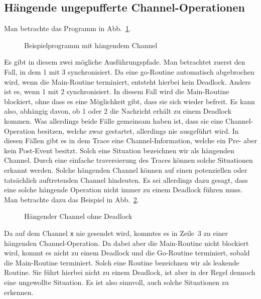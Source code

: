 \subsection{Hängende ungepufferte Channel-Operationen}\label{Chap:Analyze-Sec:Channel-SubSec:Dangling}
Man betrachte das Programm in Abb.~\ref{Chap:Analyze-Sec:Channel-SubSec:Dangling-Fig:ExDangling}.
\begin{figure}[h!]
  
  \caption{Beispielprogramm mit hängendem Channel}
  \label{Chap:Analyze-Sec:Channel-SubSec:Dangling-Fig:ExDangling}
\end{figure}
Es gibt in diesem zwei mögliche Ausführungspfade. Man betrachtet zuerst den Fall, in dem 1 mit 3 synchronisiert. 
Da eine go-Routine automatisch abgebrochen wird,  
wenn die Main-Routine terminiert, entsteht hierbei kein Deadlock. Anders ist es, wenn 1 mit 2 synchronisiert. 
In diesem Fall wird die Main-Routine blockiert, ohne dass es eine Möglichkeit gibt, dass sie sich wieder 
befreit. Es kann also, abhängig davon, ob 1 oder 2 die Nachricht erhält zu einem Deadlock kommen. Was 
allerdings beide Fälle gemeinsam haben ist, dass sie eine Channel-Operation besitzen, welche zwar 
gestartet, allerdings nie ausgeführt wird.
In diesen Fällen gibt es in dem Trace eine Channel-Information, 
welche ein Pre- aber kein Post-Event besitzt. Solch eine Situation bezeichnen wir als hängenden Channel. 
Durch eine einfache traversierung des Traces können solche Situationen erkannt werden. Solche hängenden 
Channel können auf einen potenziellen oder tatsächlich auftretenden Channel hindeuten.
Es sei allerdings dazu gesagt, dass eine solche hängende Operation nicht immer zu einem Deadlock führen muss.
Man betrachte dazu das Beispiel in Abb.~\ref{Chap:Analyze-Sec:Channel-SubSec:Dangling-Fig:ExDanglingWithout}.
\begin{figure}[h!]
  
  \caption{Hängender Channel ohne Deadlock}
  \label{Chap:Analyze-Sec:Channel-SubSec:Dangling-Fig:ExDanglingWithout}
\end{figure}
Da auf dem Channel \texttt{x} nie gesendet wird, kommtes es in Zeile~3 zu einer hängenden Channel-Operation. Da 
dabei aber die Main-Routine nicht blockiert wird, kommt es nicht zu einem Deadlock und die Go-Routine 
terminiert, sobald die Main-Routine terminiert. Solch eine Routine bezeichnen wir als leakende Routine.
Sie führt hierbei nicht zu einem Deadlock, ist aber in der Regel dennoch eine ungewollte Situation.
Es ist also sinnvoll, auch solche Situationen zu erkennen.\\\\
